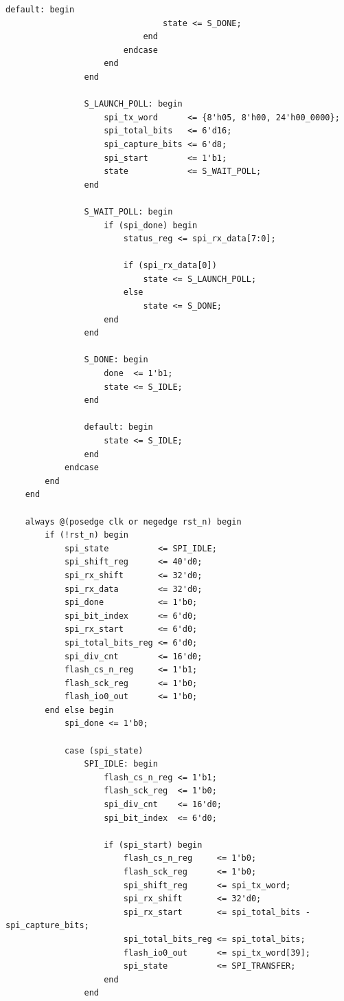 \documentclass[a4paper,10pt]{article}
\begin{document}
\begin{lstlisting}[caption=w25q128_ctrl.v]
                            default: begin
                                state <= S_DONE;
                            end
                        endcase
                    end
                end

                S_LAUNCH_POLL: begin
                    spi_tx_word      <= {8'h05, 8'h00, 24'h00_0000};
                    spi_total_bits   <= 6'd16;
                    spi_capture_bits <= 6'd8;
                    spi_start        <= 1'b1;
                    state            <= S_WAIT_POLL;
                end

                S_WAIT_POLL: begin
                    if (spi_done) begin
                        status_reg <= spi_rx_data[7:0];

                        if (spi_rx_data[0])
                            state <= S_LAUNCH_POLL;
                        else
                            state <= S_DONE;
                    end
                end

                S_DONE: begin
                    done  <= 1'b1;
                    state <= S_IDLE;
                end

                default: begin
                    state <= S_IDLE;
                end
            endcase
        end
    end

    always @(posedge clk or negedge rst_n) begin
        if (!rst_n) begin
            spi_state          <= SPI_IDLE;
            spi_shift_reg      <= 40'd0;
            spi_rx_shift       <= 32'd0;
            spi_rx_data        <= 32'd0;
            spi_done           <= 1'b0;
            spi_bit_index      <= 6'd0;
            spi_rx_start       <= 6'd0;
            spi_total_bits_reg <= 6'd0;
            spi_div_cnt        <= 16'd0;
            flash_cs_n_reg     <= 1'b1;
            flash_sck_reg      <= 1'b0;
            flash_io0_out      <= 1'b0;
        end else begin
            spi_done <= 1'b0;

            case (spi_state)
                SPI_IDLE: begin
                    flash_cs_n_reg <= 1'b1;
                    flash_sck_reg  <= 1'b0;
                    spi_div_cnt    <= 16'd0;
                    spi_bit_index  <= 6'd0;

                    if (spi_start) begin
                        flash_cs_n_reg     <= 1'b0;
                        flash_sck_reg      <= 1'b0;
                        spi_shift_reg      <= spi_tx_word;
                        spi_rx_shift       <= 32'd0;
                        spi_rx_start       <= spi_total_bits - spi_capture_bits;
                        spi_total_bits_reg <= spi_total_bits;
                        flash_io0_out      <= spi_tx_word[39];
                        spi_state          <= SPI_TRANSFER;
                    end
                end


\end{lstlisting}
\end{document}
